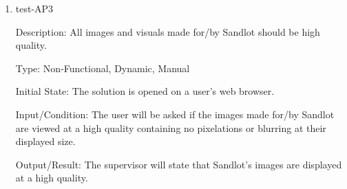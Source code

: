 \documentclass[12pt, titlepage]{article}
\begin{document}
\begin{enumerate}













\item{test-AP3\\}

Description: All images and visuals made for/by Sandlot should
be high quality.

Type: Non-Functional, Dynamic, Manual

Initial State: The solution is opened on a user's web browser.

Input/Condition: The user will be asked if the images made for/by Sandlot are viewed at
a high quality containing no pixelations or blurring at their displayed size.

Output/Result: The supervisor will state that Sandlot's images are displayed at a high
quality.


\end{enumerate}
\end{document}
